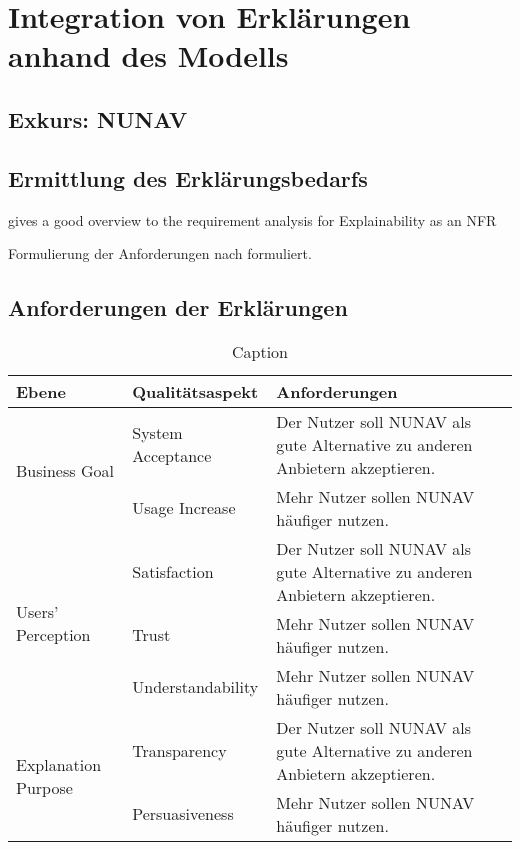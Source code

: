\section{Integration von Erklärungen anhand des Modells}

\subsection{Exkurs: NUNAV}

\subsection{Ermittlung des Erklärungsbedarfs}

\cite{golledge1999wayfinding}

\cite{bovy2012route}

\cite{kohl_explainability_2019} gives a good overview to the requirement analysis for Explainability as an NFR

Formulierung der Anforderungen nach \cite{rajnish2010quality, wiegers1999writing, alexander2002writing} formuliert.

\subsection{Anforderungen der Erklärungen}

\begin{table}[]
    \centering
    \begin{tabular}{|p{}|p{}|p{}|}
        \hline
        \textbf{Ebene} & \textbf{Qualitätsaspekt} & \textbf{Anforderungen} \\
        \hline
        \multirow{2}{*}{Business Goal}      & System Acceptance & Der Nutzer soll NUNAV als gute Alternative zu anderen Anbietern akzeptieren.\\
        \cline{2-3}
                                            & Usage Increase & Mehr Nutzer sollen NUNAV häufiger nutzen.\\
        \hline
        \multirow{3}{*}{Users' Perception} & Satisfaction & Der Nutzer soll NUNAV als gute Alternative zu anderen Anbietern akzeptieren.\\
                                            \cline{2-3}
                                            & Trust & Mehr Nutzer sollen NUNAV häufiger nutzen.\\
                                            \cline{2-3}
                                            & Understandability & Mehr Nutzer sollen NUNAV häufiger nutzen.\\
        \hline
        \multirow{2}{*}{Explanation Purpose} & Transparency & Der Nutzer soll NUNAV als gute Alternative zu anderen Anbietern akzeptieren.\\
        \cline{2-3}
                                            & Persuasiveness & Mehr Nutzer sollen NUNAV häufiger nutzen.\\
        \hline
    \end{tabular}
    \caption{Caption}
    \label{tab:my_label}
\end{table}


